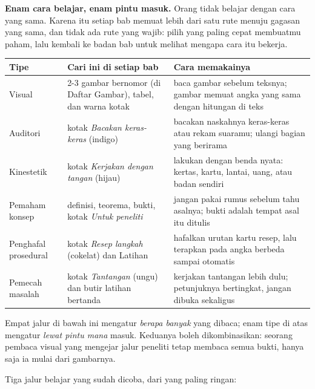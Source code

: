\documentclass[11pt,a4paper,oneside]{book}
\theoremstyle{definition}
\theoremstyle{plain}
\theoremstyle{remark}
\begin{document}
\medskip
\noindent\textbf{Enam cara belajar, enam pintu masuk.} Orang tidak belajar dengan cara
yang sama. Karena itu setiap bab memuat lebih dari satu rute menuju gagasan yang sama,
dan tidak ada rute yang wajib: pilih yang paling cepat membuatmu paham, lalu kembali ke
badan bab untuk melihat mengapa cara itu bekerja.

\begin{center}
\small
\begin{tabular}{@{}p{3.4cm}p{4.3cm}p{4.6cm}@{}}
\toprule
\textbf{Tipe} & \textbf{Cari ini di setiap bab} & \textbf{Cara memakainya} \\
\midrule
Visual & 2-3 gambar bernomor (di Daftar Gambar), tabel, dan warna kotak & baca
  gambar sebelum teksnya; gambar memuat angka yang sama dengan hitungan di teks \\[2pt]
Auditori & kotak \emph{Bacakan keras-keras} (indigo) & bacakan naskahnya keras-keras
  atau rekam suaramu; ulangi bagian yang berirama \\[2pt]
Kinestetik & kotak \emph{Kerjakan dengan tangan} (hijau) & lakukan dengan benda nyata:
  kertas, kartu, lantai, uang, atau badan sendiri \\[2pt]
Pemaham konsep & definisi, teorema, bukti, kotak \emph{Untuk peneliti} & jangan pakai
  rumus sebelum tahu asalnya; bukti adalah tempat asal itu ditulis \\[2pt]
Penghafal prosedural & kotak \emph{Resep langkah} (cokelat) dan Latihan & hafalkan
  urutan kartu resep, lalu terapkan pada angka berbeda sampai otomatis \\[2pt]
Pemecah masalah & kotak \emph{Tantangan} (ungu) dan butir latihan bertanda &
  kerjakan tantangan lebih dulu; petunjuknya bertingkat, jangan dibuka sekaligus \\
\bottomrule
\end{tabular}
\end{center}

Empat jalur di bawah ini mengatur \emph{berapa banyak} yang dibaca; enam tipe di atas
mengatur \emph{lewat pintu mana} masuk. Keduanya boleh dikombinasikan: seorang pembaca
visual yang mengejar jalur peneliti tetap membaca semua bukti, hanya saja ia mulai dari
gambarnya.

Tiga jalur belajar yang sudah dicoba, dari yang paling ringan:
\end{document}
